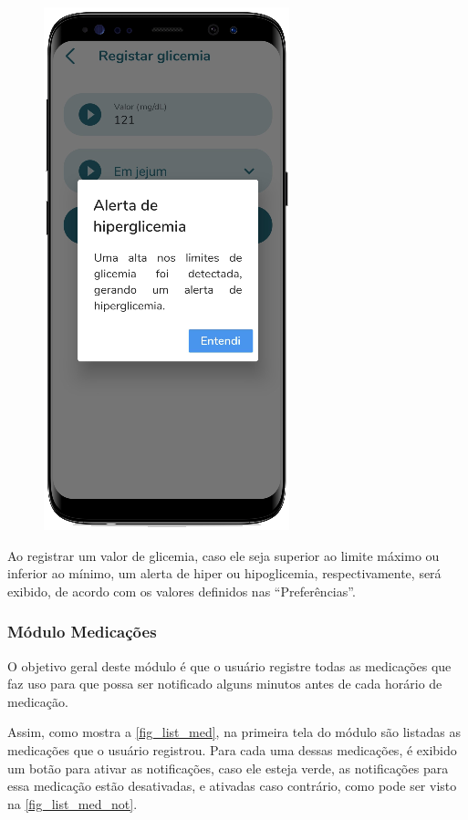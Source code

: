 \begin{figure}[htb]
\begin{minipage}{0.45\textwidth}
        \includegraphics[scale=0.7]{Imagens/desenvolvimento/app/alerta_glicemia.png}
    \end{minipage}
\end{figure}

Ao registrar um valor de glicemia, caso ele seja superior ao limite máximo ou inferior ao mínimo,
um alerta de hiper ou hipoglicemia, respectivamente, será exibido, de acordo com os valores definidos
nas “Preferências”.

\subsubsection{Módulo Medicações}

O objetivo geral deste módulo é que o usuário registre todas as medicações que faz uso para que possa ser
notificado alguns minutos antes de cada horário de medicação.

Assim, como mostra a \autoref{fig_list_med}, na primeira tela do módulo são listadas as medicações que o usuário
registrou. Para cada uma dessas medicações, é exibido um botão para ativar as notificações, caso ele esteja verde,
as notificações para essa medicação estão desativadas, e ativadas caso contrário, como pode ser visto
na \autoref{fig_list_med_not}.

